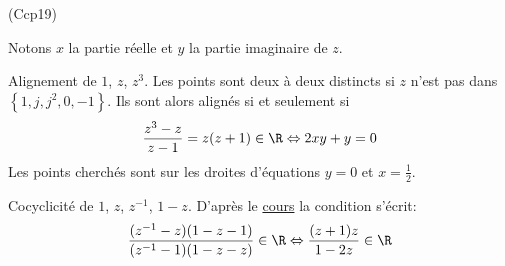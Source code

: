 \begin{tiny}(Ccp19)\end{tiny}
Notons $x$ la partie réelle et $y$ la partie imaginaire de $z$.

Alignement de $1$, $z$, $z^3$.\newline
Les points sont deux à deux distincts si $z$ n'est pas dans $\left\lbrace 1, j, j^2, 0, -1 \right\rbrace$. Ils sont alors alignés si et seulement si
\begin{displaymath}
  \frac{z^3 - z}{z-1} = z(z+1)\in \R
\Leftrightarrow 2xy+y = 0
\end{displaymath}
Les points cherchés sont sur les droites d'équations $y=0$ et $x=\frac{1}{2}$. 

Cocyclicité de $1$, $z$, $z^{-1}$, $1-z$.\newline
D'après le \href{\baseurl C2002.pdf}{cours} la condition s'écrit:
\begin{displaymath}
  \frac{(z^{-1}-z)(1-z-1)}{(z^{-1}-1)(1-z-z)} \in \R
  \Leftrightarrow \frac{(z+1)z}{1-2z}\in \R
\end{displaymath}
